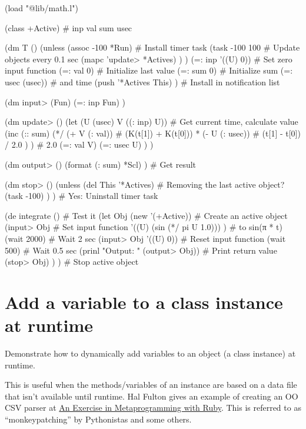 \begin{wideverbatim}

(load "@lib/math.l")

(class +Active)
# inp val sum usec

(dm T ()
   (unless (assoc -100 *Run)           # Install timer task
      (task -100 100                   # Update objects every 0.1 sec
         (mapc 'update> *Actives) ) )
   (=: inp '((U) 0))                   # Set zero input function
   (=: val 0)                          # Initialize last value
   (=: sum 0)                          # Initialize sum
   (=: usec (usec))                    # and time
   (push '*Actives This) )             # Install in notification list

(dm input> (Fun)
   (=: inp Fun) )

(dm update> ()
   (let (U (usec)  V ((: inp) U))      # Get current time, calculate value
      (inc (:: sum)
         (*/
            (+ V (: val))              # (K(t[1]) + K(t[0])) *
            (- U (: usec))             # (t[1] - t[0]) /
            2.0 ) )                    # 2.0
      (=: val V)
      (=: usec U) ) )

(dm output> ()
   (format (: sum) *Scl) )             # Get result

(dm stop> ()
   (unless (del This '*Actives)        # Removing the last active object?
      (task -100) ) )                  # Yes: Uninstall timer task

(de integrate ()                       # Test it
   (let Obj (new '(+Active))           # Create an active object
      (input> Obj                      # Set input function
         '((U) (sin (*/ pi U 1.0))) )  # to sin(π * t)
      (wait 2000)                      # Wait 2 sec
      (input> Obj '((U) 0))            # Reset input function
      (wait 500)                       # Wait 0.5 sec
      (prinl "Output: " (output> Obj)) # Print return value
      (stop> Obj) ) )                  # Stop active object

\end{wideverbatim}

\pagebreak{}
\section*{Add a variable to a class instance at runtime}

Demonstrate how to dynamically add variables to an object (a class
instance) at runtime.

This is useful when the methods/variables of an instance are based on
a data file that isn't available until runtime. Hal Fulton gives an
example of creating an OO CSV parser at
\href{http://www.devsource.com/article2/0,1759,1928562,00.asp}{An
  Exercise in Metaprogramming with Ruby}. This is referred to as
``monkeypatching'' by Pythonistas and some others.


